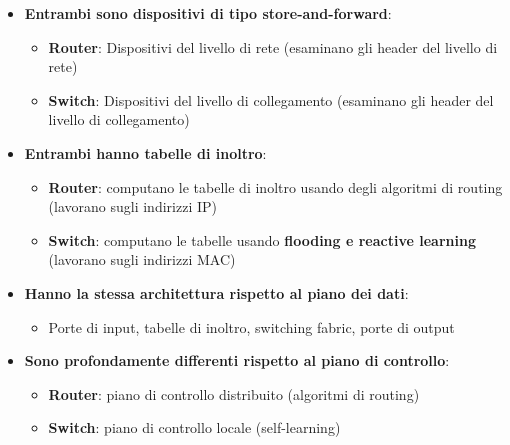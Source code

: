 \documentclass[12pt]{article}
\begin{document}
\begin{itemize}
    \item \textbf{Entrambi sono dispositivi di tipo store-and-forward}:
    \begin{itemize}
        \item \textbf{Router}: Dispositivi del livello di rete (esaminano gli header del livello di rete)
        \item \textbf{Switch}: Dispositivi del livello di collegamento (esaminano gli header del livello di collegamento)
    \end{itemize}
    \item \textbf{Entrambi hanno tabelle di inoltro}:
    \begin{itemize}
        \item \textbf{Router}: computano le tabelle di inoltro usando degli algoritmi di routing (lavorano sugli indirizzi IP)
        \item \textbf{Switch}: computano le tabelle usando \textbf{flooding e reactive learning} (lavorano sugli indirizzi MAC)
    \end{itemize}
    \item \textbf{Hanno la stessa architettura rispetto al piano dei dati}:
    \begin{itemize}
        \item Porte di input, tabelle di inoltro, switching fabric, porte di output
    \end{itemize}
    \item \textbf{Sono profondamente differenti rispetto al piano di controllo}:
    \begin{itemize}
        \item \textbf{Router}: piano di controllo distribuito (algoritmi di routing)
        \item \textbf{Switch}: piano di controllo locale (self-learning)
    \end{itemize}
\end{itemize}
\end{document}
